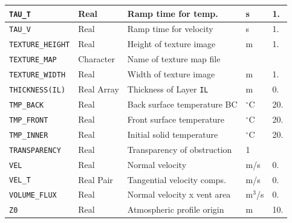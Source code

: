 \documentclass[11pt]{book}
\newcommand{\ct}{\tt\small}
\begin{document}
\begin{longtable}{|l|l|l|l|l|}
{\ct TAU\_T}                          & Real            & Ramp time for temp.               & s                   & 1.     \\ \hline
{\ct TAU\_V}                          & Real            & Ramp time for velocity            & s                   & 1.     \\ \hline
{\ct TEXTURE\_HEIGHT}                 & Real            & Height of texture image           & m                   & 1.     \\ \hline
{\ct TEXTURE\_MAP}                    & Character       & Name of texture map file          &                     &        \\ \hline
{\ct TEXTURE\_WIDTH}                  & Real            & Width of texture image            & m                   & 1.     \\ \hline
{\ct THICKNESS(IL)}                   & Real Array      & Thickness of Layer {\ct IL}       & m                   & 0.    \\ \hline
{\ct TMP\_BACK}                       & Real            & Back surface temperature BC       & $^\circ$C           & 20.    \\ \hline
{\ct TMP\_FRONT}                      & Real            & Front surface temperature         & $^\circ$C           & 20.    \\ \hline
{\ct TMP\_INNER}                      & Real            & Initial solid temperature         & $^\circ$C           & 20.    \\ \hline
{\ct TRANSPARENCY}                    & Real            & Transparency of obstruction       &    1                &           \\ \hline
{\ct VEL    }                         & Real            & Normal velocity                   & m/s                 & 0.     \\ \hline
{\ct VEL\_T }                         & Real Pair       & Tangential velocity comps.        & m/s                 & 0.     \\ \hline
{\ct VOLUME\_FLUX}                    & Real            & Normal velocity x vent area       & m$^3$/s             & 0.     \\ \hline
{\ct Z0 }                             & Real            & Atmospheric profile origin        &  m                  & 10.    \\ \hline
\end{longtable}

\vspace{\baselineskip}
\end{document}
